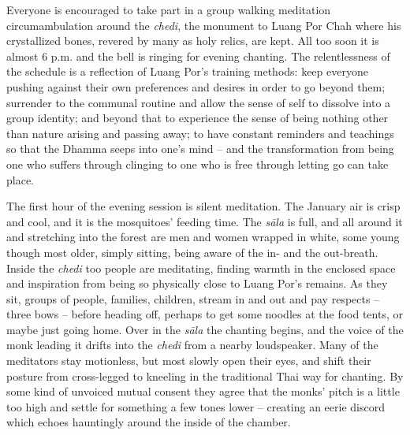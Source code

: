 Everyone is encouraged to take part in a group walking meditation
circumambulation around the \emph{chedi}, the monument to Luang Por Chah
where his crystallized bones, revered by many as holy relics, are kept. 
All too soon it is almost 6 p.m. and the bell is ringing for evening
chanting. The relentlessness of the schedule is a reflection of Luang
Por's training methods: keep everyone pushing against their own
preferences and desires in order to go beyond them; surrender to the
communal routine and allow the sense of self to dissolve into a group
identity; and beyond that to experience the sense of being nothing other
than nature arising and passing away; to have constant reminders and
teachings so that the Dhamma seeps into one's mind -- and the
transformation from being one who suffers through clinging to one who is
free through letting go can take place. 

The first hour of the evening session is silent meditation. The January
air is crisp and cool, and it is the mosquitoes' feeding time. The
\emph{sāla} is full, and all around it and stretching into the forest
are men and women wrapped in white, some young though most older, simply
sitting, being aware of the in- and the out-breath. Inside the
\emph{chedi} too people are meditating, finding warmth in the enclosed
space and inspiration from being so physically close to Luang Por's
remains. As they sit, groups of people, families, children, stream in
and out and pay respects -- three bows -- before heading off, perhaps to
get some noodles at the food tents, or maybe just going home. Over in
the \emph{sāla} the chanting begins, and the voice of the monk leading
it drifts into the \emph{chedi} from a nearby loudspeaker. Many of the
meditators stay motionless, but most slowly open their eyes, and shift
their posture from cross-legged to kneeling in the traditional Thai way
for chanting. By some kind of unvoiced mutual consent they agree that
the monks' pitch is a little too high and settle for something a few
tones lower -- creating an eerie discord which echoes hauntingly around
the inside of the chamber. 

